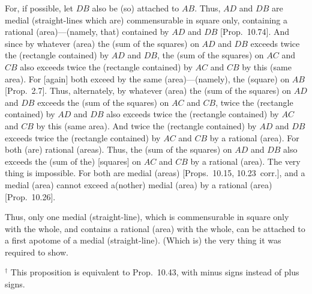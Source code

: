 \begin{Parallel}{}{}
{For, if possible, let $DB$ also be (so) attached to $AB$. Thus, $AD$ and
$DB$ are medial (straight-lines which are) commensurable in square only, containing a rational (area)---(namely, that)
contained by $AD$ and $DB$ [Prop.~10.74]. 
And since by whatever (area)
the (sum of the squares) on $AD$ and $DB$ exceeds twice the
(rectangle contained) by $AD$ and $DB$,  the (sum of the squares)
on $AC$ and $CB$ also exceeds twice the (rectangle contained) by $AC$ and
$CB$ by this (same area). For [again] both exceed by the same (area)---(namely), the (square)
on $AB$ [Prop.~2.7]. Thus, alternately, 
by whatever (area) the (sum of the squares) on $AD$ and 
$DB$ exceeds the (sum of the squares) on $AC$ and $CB$, 
 twice the (rectangle contained) by $AD$ and $DB$
also exceeds twice the (rectangle contained) by $AC$ and $CB$ by this (same area).
And twice the (rectangle contained) by $AD$ and $DB$ exceeds twice the (rectangle contained) by $AC$ and $CB$ by a rational (area). For both
(are) rational (areas). Thus,  the (sum of the squares) on $AD$ and $DB$ also
exceeds the (sum of the) [squares] on $AC$ and $CB$ by a
rational (area). The very thing is impossible. For both are
medial (areas) [Props.~10.15, 10.23~corr.],
and a medial (area) cannot exceed a(nother) medial (area) by a rational
(area) [Prop.~10.26].

Thus, only one medial (straight-line),
which is commensurable in square only with the whole, and
contains a rational (area) with the whole, can be attached
to a first apotome of a medial (straight-line). (Which is) the very thing it was required to
show.}
\end{Parallel}
{\footnotesize\noindent$^\dag$ This proposition is equivalent to 
Prop.~10.43, with minus signs instead of
plus signs.}

